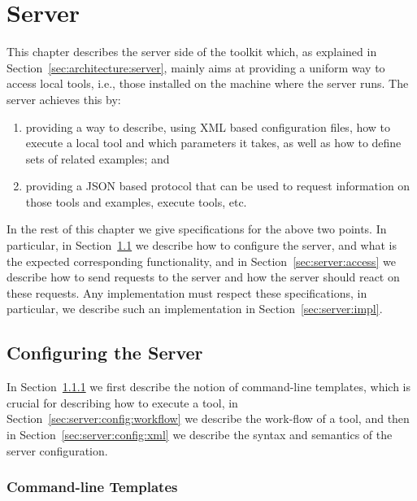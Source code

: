 {%
}

\chapter{\ei Server}
\label{ch:server}

This chapter describes the server side of the \ei toolkit which, as
explained in Section~\ref{sec:architecture:server}, mainly aims at
providing a uniform way to access local tools, i.e., those installed
on the machine where the server runs.  The \ei server achieves this
by:
%
\begin{enumerate}
\item providing a way to describe, using XML based configuration
  files, how to execute a local tool and which parameters it takes, as
  well as how to define sets of related examples; and
%
\item providing a JSON based protocol that can be used to request
  information on those tools and examples, execute tools, etc.
\end{enumerate}
%
In the rest of this chapter we give specifications for the above two
points. In particular, in Section~\ref{sec:server:config} we describe
how to configure the server, and what is the expected corresponding
functionality, and in Section~\ref{sec:server:access} we describe how
to send requests to the server and how the server should react on
these requests.
%
Any implementation must respect these specifications, in particular,
we describe such an implementation in Section~\ref{sec:server:impl}.



\section{Configuring the \ei Server}
\label{sec:server:config}

In Section~\ref{sec:server:config:cmdlntmp} we first describe the
notion of command-line templates, which is crucial for describing how
to execute a tool, in Section~\ref{sec:server:config:workflow} we
describe the work-flow of a tool, and then in
Section~\ref{sec:server:config:xml} we describe the syntax and
semantics of the server configuration.

\subsection{Command-line Templates}
\label{sec:server:config:cmdlntmp}

